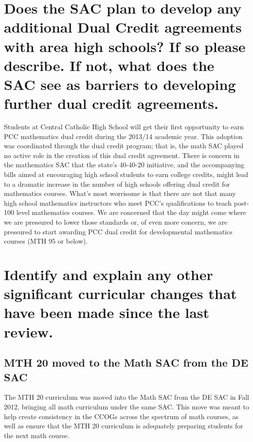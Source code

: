 \section[Future dual credit relationships]{Does the SAC plan to develop any
additional Dual Credit agreements with area high schools?  If so please
describe.   If not, what does the SAC see as barriers to developing further dual
credit agreements. }
Students at Central Catholic High School will get their first opportunity to
earn PCC mathematics dual credit during the 2013/14 academic year.  This
adoption was coordinated through the dual credit program; that is, the math SAC
played no active role in the creation of this dual credit agreement.
There is concern in the mathematics SAC that the state's 40-40-20 initiative, and the accompanying bills aimed at encouraging high school students to earn college credits, might lead to a dramatic increase in the number of high schools offering dual credit for mathematics courses.  What's most worrisome is that there are not that many high school mathematics instructors who meet PCC's qualifications to teach post-100 level mathematics courses.  We are concerned that the day might come where we are pressured to lower those standards or, of even more concern, we are pressured to start awarding PCC dual credit for developmental mathematics courses (MTH 95 or below).


\section[Other significant curricular changes]{Identify and explain any other
significant curricular changes that have been made since the last
review.}\label{cur:sec:other}

\subsection{MTH 20 moved to the Math SAC from the DE SAC}
The MTH 20 curriculum was moved into the Math SAC from the DE SAC in Fall 2012,
bringing all math curriculum under the same SAC.  This move was meant to help
create consistency in the CCOGs across the spectrum of math courses, as well as
ensure that the MTH 20 curriculum is adequately preparing students for the next
math course.

